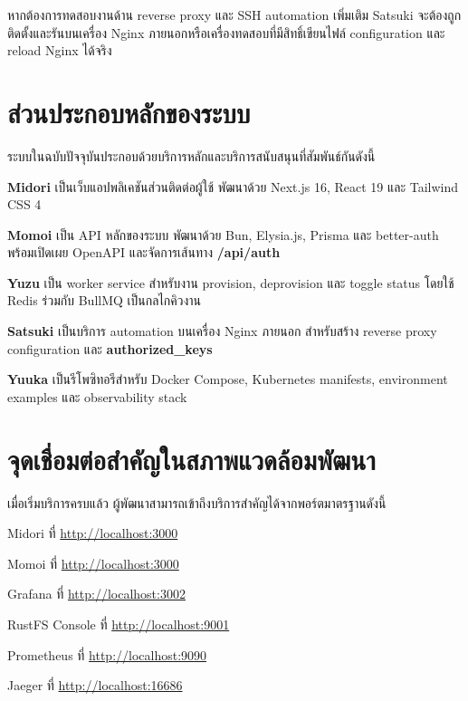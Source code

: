 \hspace*{1.3em}
หากต้องการทดสอบงานด้าน reverse proxy และ SSH automation เพิ่มเติม Satsuki จะต้องถูกติดตั้งและรันบนเครื่อง Nginx ภายนอกหรือเครื่องทดสอบที่มีสิทธิ์เขียนไฟล์ configuration และ reload Nginx ได้จริง

\section{ส่วนประกอบหลักของระบบ}
\hspace*{1.3em}
ระบบในฉบับปัจจุบันประกอบด้วยบริการหลักและบริการสนับสนุนที่สัมพันธ์กันดังนี้

\begin{mycustomenum2}
    \item \textbf{Midori} เป็นเว็บแอปพลิเคชันส่วนติดต่อผู้ใช้ พัฒนาด้วย Next.js 16, React 19 และ Tailwind CSS 4
    \item \textbf{Momoi} เป็น API หลักของระบบ พัฒนาด้วย Bun, Elysia.js, Prisma และ better-auth พร้อมเปิดเผย OpenAPI และจัดการเส้นทาง \textbf{/api/auth}
    \item \textbf{Yuzu} เป็น worker service สำหรับงาน provision, deprovision และ toggle status โดยใช้ Redis ร่วมกับ BullMQ เป็นกลไกคิวงาน
    \item \textbf{Satsuki} เป็นบริการ automation บนเครื่อง Nginx ภายนอก สำหรับสร้าง reverse proxy configuration และ \textbf{authorized\_keys}
    \item \textbf{Yuuka} เป็นรีโพซิทอรีสำหรับ Docker Compose, Kubernetes manifests, environment examples และ observability stack
\end{mycustomenum2}

\section{จุดเชื่อมต่อสำคัญในสภาพแวดล้อมพัฒนา}
\hspace*{1.3em}
เมื่อเริ่มบริการครบแล้ว ผู้พัฒนาสามารถเข้าถึงบริการสำคัญได้จากพอร์ตมาตรฐานดังนี้

\begin{mycustomenum2}
    \item Midori ที่ \url{http://localhost:3000}
    \item Momoi ที่ \url{http://localhost:3000}
    \item Grafana ที่ \url{http://localhost:3002}
    \item RustFS Console ที่ \url{http://localhost:9001}
    \item Prometheus ที่ \url{http://localhost:9090}
    \item Jaeger ที่ \url{http://localhost:16686}
\end{mycustomenum2}

